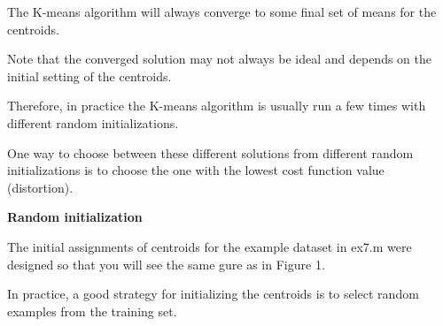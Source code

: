 \begin{frame}
The K-means algorithm will always converge to some final set of means for the centroids.

Note that the converged solution may not always be ideal and depends on the initial setting of the centroids. 


Therefore, in practice the K-means algorithm is usually run a few times with different random initializations. 


One way to choose between these different solutions from different random initializations is to choose the one with the lowest cost function value (distortion).
\end{frame}
\begin{frame}
\textbf{Random initialization}

The initial assignments of centroids for the example dataset in ex7.m were designed so that you will see the same gure as in Figure 1. 


In practice, a good strategy for initializing the centroids is to select random examples from the training set.

\end{frame}

